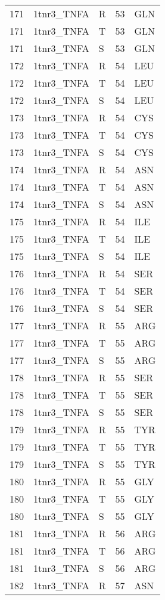 \begin{tiny}
\begin{longtable}[l]{l|l|l|l|l}
	171 & 1tnr3\_TNFA & R & 53 & GLN \\
	171 & 1tnr3\_TNFA & T & 53 & GLN \\
	171 & 1tnr3\_TNFA & S & 53 & GLN \\
	172 & 1tnr3\_TNFA & R & 54 & LEU \\
	172 & 1tnr3\_TNFA & T & 54 & LEU \\
	172 & 1tnr3\_TNFA & S & 54 & LEU \\
	173 & 1tnr3\_TNFA & R & 54 & CYS \\
	173 & 1tnr3\_TNFA & T & 54 & CYS \\
	173 & 1tnr3\_TNFA & S & 54 & CYS \\
	174 & 1tnr3\_TNFA & R & 54 & ASN \\
	174 & 1tnr3\_TNFA & T & 54 & ASN \\
	174 & 1tnr3\_TNFA & S & 54 & ASN \\
	175 & 1tnr3\_TNFA & R & 54 & ILE \\
	175 & 1tnr3\_TNFA & T & 54 & ILE \\
	175 & 1tnr3\_TNFA & S & 54 & ILE \\
	176 & 1tnr3\_TNFA & R & 54 & SER \\
	176 & 1tnr3\_TNFA & T & 54 & SER \\
	176 & 1tnr3\_TNFA & S & 54 & SER \\
	177 & 1tnr3\_TNFA & R & 55 & ARG \\
	177 & 1tnr3\_TNFA & T & 55 & ARG \\
	177 & 1tnr3\_TNFA & S & 55 & ARG \\
	178 & 1tnr3\_TNFA & R & 55 & SER \\
	178 & 1tnr3\_TNFA & T & 55 & SER \\
	178 & 1tnr3\_TNFA & S & 55 & SER \\
	179 & 1tnr3\_TNFA & R & 55 & TYR \\
	179 & 1tnr3\_TNFA & T & 55 & TYR \\
	179 & 1tnr3\_TNFA & S & 55 & TYR \\
	180 & 1tnr3\_TNFA & R & 55 & GLY \\
	180 & 1tnr3\_TNFA & T & 55 & GLY \\
	180 & 1tnr3\_TNFA & S & 55 & GLY \\
	181 & 1tnr3\_TNFA & R & 56 & ARG \\
	181 & 1tnr3\_TNFA & T & 56 & ARG \\
	181 & 1tnr3\_TNFA & S & 56 & ARG \\
	182 & 1tnr3\_TNFA & R & 57 & ASN \\

\end{longtable}
\end{tiny}
